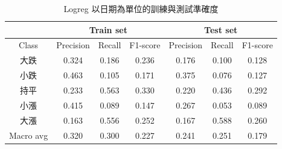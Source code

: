 \begin{table}[H]
\centering
{\fontsize{12.5}{16}\selectfont
\begin{tabular}{c|ccc|ccc}
& \multicolumn{3}{c|}{Train set} & \multicolumn{3}{c}{Test set} \\
\hline
Class & Precision & Recall & F1-score & Precision & Recall & F1-score \\
\hline
大跌 & 0.324 & 0.186 & 0.236 & 0.176 & 0.100 & 0.128 \\
小跌 & 0.463 & 0.105 & 0.171 & 0.375 & 0.076 & 0.127 \\
持平 & 0.233 & 0.563 & 0.330 & 0.220 & 0.436 & 0.292 \\
小漲 & 0.415 & 0.089 & 0.147 & 0.267 & 0.053 & 0.089 \\
大漲 & 0.163 & 0.556 & 0.252 & 0.167 & 0.588 & 0.260 \\
\hline
Macro avg & 0.320 & 0.300 & 0.227 & 0.241 & 0.251 & 0.179 \\
\end{tabular}
}
\caption{Logreg 以日期為單位的訓練與測試準確度}
\label{tab:classifier_1_report_logreg_filtered}
\end{table}